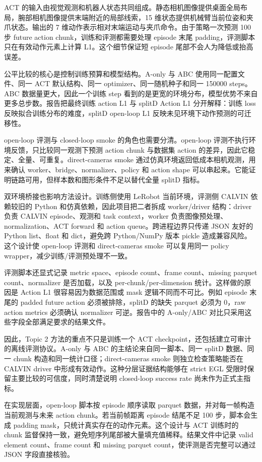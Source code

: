 \documentclass{article}
\begin{document}
	ACT 的输入由视觉观测和机器人状态共同组成。静态相机图像提供桌面全局布局，腕部相机图像提供末端附近的局部线索，15 维状态提供机械臂当前位姿和夹爪状态。输出的 7 维动作表示相对末端运动与夹爪命令。由于策略一次预测 100 步 future action chunk，训练和评测都需要处理 episode 末尾 padding，评测脚本只在有效动作元素上计算 L1。这个细节保证短 episode 尾部不会人为降低或抬高误差。

	公平比较的核心是控制训练预算和模型结构。A-only 与 ABC 使用同一配置文件、同一 ACT 默认结构、同一 optimizer、同一随机种子和同一 150000 steps。ABC 数据量更大，因此一个训练 step 看到的是更宽的环境分布，模型优势不来自更多总步数。报告把最终训练 action L1 与 splitD Action L1 分开解释：训练 loss 反映拟合训练分布的难度，splitD open-loop L1 反映未见环境下动作预测的可迁移性。

	open-loop 评测与 closed-loop smoke 的角色也需要分清。open-loop 评测不执行环境反馈，只比较同一观测下预测 action chunk 与数据集 action 的差异，因此它稳定、全量、可重复。direct-cameras smoke 通过仿真环境返回低成本相机观测，用来确认 worker、bridge、normalizer、policy 和 action shape 可以串起来。它能证明链路可用，但样本数和图形条件不足以替代全量 splitD 指标。

	双环境桥接也影响方法设计。训练侧使用 LeRobot 当前环境，评测侧 CALVIN 依赖较旧的 Python 和仿真依赖，因此项目把二者拆成 worker/driver 结构：driver 负责 CALVIN episode、观测和 task context，worker 负责图像预处理、normalization、ACT forward 和 action queue。跨进程边界只传递 JSON 友好的 Python list、float 和 dict，避免跨 Python/NumPy 版本 pickle 造成兼容风险。这个设计使 open-loop 评测和 direct-cameras smoke 可以复用同一 policy wrapper，减少训练/评测预处理不一致。

	评测脚本还显式记录 metric space、episode count、frame count、missing parquet count、normalizer 是否加载，以及 per-chunk/per-dimension 统计。这样做的原因是 Action L1 很容易因为数据范围或 mask 逻辑不同而不可比。例如 episode 末尾的 padded future action 必须被排除，splitD 的缺失 parquet 必须为 0，raw action metrics 必须确认 normalizer 可逆。报告中的 A-only/ABC 对比只采用这些字段全部满足要求的结果文件。

	因此，Topic 2 方法的重点不只是训练一个 ACT checkpoint，还包括建立可审计的离线评测协议。A-only 与 ABC 的主结论来自同一脚本、同一 splitD 数据、同一 chunk 构造和同一统计口径；direct-cameras smoke 则独立检查策略能否在 CALVIN driver 中形成有效动作。这种分层证据结构能够在 strict EGL 受限时保留主要比较的可信度，同时清楚说明 closed-loop success rate 尚未作为正式主指标。

	在实现层面，open-loop 脚本按 episode 顺序读取 parquet 数据，并对每一帧构造当前观测与未来 action chunk。若当前帧距离 episode 结尾不足 100 步，脚本会生成 padding mask，只统计真实存在的动作元素。这个设计与 ACT 训练时的 chunk 监督保持一致，避免短序列尾部被大量填充值稀释。结果文件中记录 valid element count、frame count 和 missing parquet count，使评测是否完整可以通过 JSON 字段直接核验。
\end{document}
